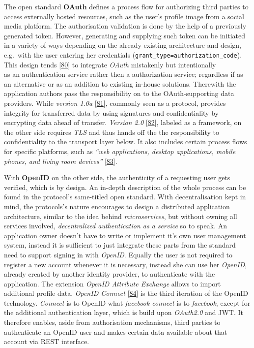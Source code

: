 \documentclass[12pt,english,a4paper,titlepage,cleardoublepage=empty,dottedtoc]{report}
\begin{document}
The open standard \textbf{\protect\hypertarget{link_oauth}{}{OAuth}}
defines a process flow for authorizing third parties to access
externally hosted resources, such as the user's profile image from a
social media platform. The authorisation validation is done by the help
of a previously generated token. However, generating and supplying such
token can be initiated in a variety of ways depending on the already
existing architecture and design, e.g.~with the user entering her
credentials (\texttt{grant\_type=authorization\_code}). This design
tends
{[}\protect\hyperlink{ref-web_2012_problem-with-oauth-for-authentication}{80}{]}
to integrate \emph{OAuth} mistakenly but intentionally\\
as an authentication service rather then a authorization service;
regardless if as an alternative or as an addition to existing in-house
solutions. Therewith the application authors pass the responsibility on
to the OAuth-supporting data providers. While \emph{version 1.0a}
{[}\protect\hyperlink{ref-web_spec_oauth-1a}{81}{]}, commonly seen as a
protocol, provides integrity for transferred data by using signatures
and confidentiality by encrypting data ahead of transfer. \emph{Version
2.0} {[}\protect\hyperlink{ref-web_spec_oauth-2}{82}{]}, labeled as a
framework, on the other side requires \emph{TLS} and thus hands off the
the responsibility to confidentiality to the transport layer below. It
also includes certain process flows for specific platforms, such as
\emph{``web applications, desktop applications, mobile phones, and
living room devices''}
{[}\protect\hyperlink{ref-web_2016_oauth-2}{83}{]}.

With \textbf{OpenID} on the other side, the authenticity of a requesting
user gets verified, which is by design. An in-depth description of the
whole process can be found in the protocol's same-titled open standard.
With decentralisation kept in mind, the protocols's nature encourages to
design a distributed application architecture, similar to the idea
behind \emph{microservices}, but without owning all services involved,
\emph{decentralized authentication as a service} so to speak. An
application owner doesn't have to write or implement it's own user
management system, instead it is sufficient to just integrate these
parts from the standard need to support signing in with \emph{OpenID}.
Equally the user is not required to register a new account whenever it
is necessary, instead she can use her \emph{OpenID}, already created by
another identity provider, to authenticate with the application. The
extension \emph{OpenID Attribute Exchange} allows to import additional
profile data. \emph{OpenID Connect}
{[}\protect\hyperlink{ref-web_spec_openid-connect-1}{84}{]} is the third
iteration of the OpenID technology. \emph{Connect} is to OpenID what
\emph{facebook connect} is to \emph{facebook}, except for the additional
authentication layer, which is build upon \emph{OAuth2.0} and JWT. It
therefore enables, aside from authorisation mechanisms, third parties to
authenticate an OpenID-user and makes certain data available about that
account via REST interface.
\end{document}

